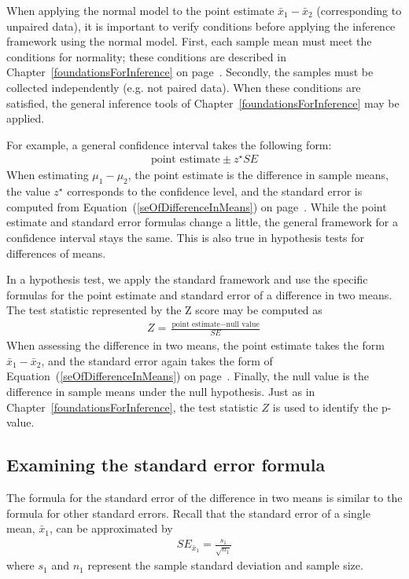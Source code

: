 When applying the normal model to the point estimate $\bar{x}_1 - \bar{x}_2$ (corresponding to unpaired data), it is important to verify conditions before applying the inference framework using the normal model. First, each sample mean must meet the conditions for normality; these conditions are described in Chapter~\ref{foundationsForInference} on page~\pageref{terBoxOfCondForXBarBeingNearlyNormalAndSEBeingAccurate}. Secondly, the samples must be collected independently (e.g. not paired data). When these conditions are satisfied, the general inference tools of Chapter~\ref{foundationsForInference} may be applied.

For example, a general confidence interval takes the following form:
\begin{eqnarray*}
\text{point estimate} \pm z^{\star} SE
\end{eqnarray*}
When estimating $\mu_1 - \mu_2$, the point estimate is the difference in sample means, the value $z^{\star}$ corresponds to the confidence level, and the standard error is computed from Equation~(\ref{seOfDifferenceInMeans}) on page~\pageref{seOfDifferenceInMeans}. While the point estimate and standard error formulas change a little, the general framework for a confidence interval stays the same. This is also true in hypothesis tests for differences of means.

In a hypothesis test, we apply the standard framework and use the specific formulas for the point estimate and standard error of a difference in two means. The test statistic represented by the Z score may be computed as
\begin{eqnarray*}
Z = \frac{\text{point estimate} - \text{null value}}{SE}
\end{eqnarray*}
When assessing the difference in two means, the point estimate takes the form $\bar{x}_1 - \bar{x}_2$, and the standard error again takes the form of Equation~(\ref{seOfDifferenceInMeans}) on page~\pageref{seOfDifferenceInMeans}. Finally, the null value is the difference in sample means under the null hypothesis. Just as in Chapter~\ref{foundationsForInference}, the test statistic $Z$ is used to identify the p-value.

\subsection{Examining the standard error formula}

The formula for the standard error of the difference in two means is similar to the formula for other standard errors. Recall that the standard error of a single mean, $\bar{x}_1$, can be approximated by
\begin{eqnarray*}
SE_{\bar{x}_1} = \frac{s_1}{\sqrt{n_1}}
\end{eqnarray*}
where $s_1$ and $n_1$ represent the sample standard deviation and sample size.

